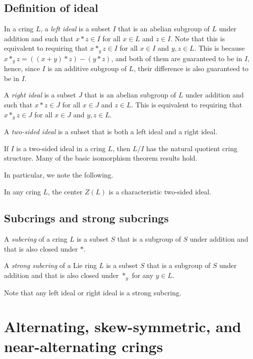 \documentclass[10pt]{amsart}
\begin{document}
\subsection{Definition of ideal}

In a cring $L$, a {\em left ideal} is a subset $I$ that is an
abelian subgroup of $L$ under addition and such that $x * z \in I$ for
all $x \in L$ and $z \in I$. Note that this is equivalent to requiring
that $x *_y z \in I$ for all $x \in I$ and $y,z \in L$. This is
because $x *_y z = ((x + y) * z) - (y * z)$, and both of them are
guaranteed to be in $I$, hence, since $I$ is an additive subgroup of
$L$, their difference is also guaranteed to be in $I$.

A {\em right ideal} is a subset $J$ that is an abelian subgroup of $L$
under addition and such that $x * z \in J$ for all $x \in J$ and $z
\in L$. This is equivalent to requiring that $x *_y z \in J$ for all
$x \in J$ and $y,z \in L$.

A {\em two-sided ideal} is a subset that is both a left
ideal and a right ideal.

If $I$ is a two-sided ideal in a cring $L$, then $L/I$ has the
natural quotient cring structure. Many of the basic isomorphism
theorem results hold.

In particular, we note the following.

\begin{lemma}
  In any cring $L$, the center $Z(L)$ is a characteristic two-sided
  ideal.
\end{lemma}

\subsection{Subcrings and strong subcrings}

A {\em subcring} of a cring $L$ is a subset $S$ that is a
subgroup of $S$ under addition and that is also closed under $*$.

A {\em strong subcring} of a Lie ring $L$ is a subset $S$ that is a
subgroup of $S$ under addition and that is also closed under $*_y$ for
any $y \in L$.

Note that any left ideal or right ideal is a strong subcring.

\section{Alternating, skew-symmetric, and near-alternating crings}
\end{document}
